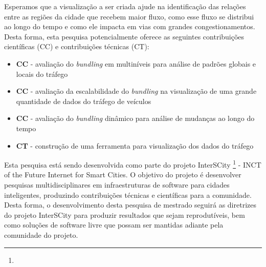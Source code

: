   Esperamos que a visualização a ser criada ajude na identificação das relações
entre as regiões da cidade que recebem maior fluxo, como esse fluxo se
distribui ao longo do tempo e como ele impacta em vias com grandes
congestionamentos. Desta forma, esta pesquisa potencialmente oferece as
seguintes contribuições científicas (CC) e contribuições técnicas (CT):

\begin{itemize}
  \item \textbf{CC} - avaliação do \emph{bundling} em multiníveis para análise de
padrões globais e locais do tráfego

  \item \textbf{CC} - avaliação da escalabilidade do \emph{bundling} na visualização de uma grande
quantidade de dados do tráfego de veículos

  \item \textbf{CC} - avaliação do \emph{bundling} dinâmico para análise de mudanças ao longo
do tempo

  \item \textbf{CT} - construção de uma ferramenta para visualização dos dados do tráfego
\end{itemize}

Esta pesquisa está sendo desenvolvida como parte do projeto InterSCity
\footnote{} - INCT of the Future Internet for Smart
Cities. O objetivo do projeto é desenvolver pesquisas multidisciplinares em
infraestruturas de software para cidades inteligentes, produzindo contribuições
técnicas e científicas para a comunidade. Desta forma, o desenvolvimento desta
pesquisa de mestrado seguirá as diretrizes do projeto InterSCity para produzir
resultados que sejam reprodutíveis, bem como soluções de software
livre que possam ser mantidas adiante pela comunidade do projeto.
